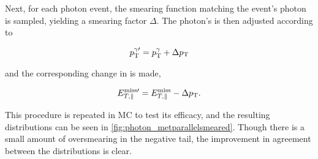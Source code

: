 Next, for each photon event, the smearing function matching the event's photon \pt is sampled, yielding a smearing factor $\Delta$\pt. The photon's \pt is then adjusted according to 

\begin{equation}
p_{\text{T}}^{\gamma\prime} = p_{\text{T}}^\gamma + \Delta p_{\text{T}} 
\end{equation} 

and the corresponding change in \met is made,

\begin{equation}
E_{T,\parallel}^{\text{miss}\prime} = E_{T,\parallel}^{\mathrm{miss}} - \Delta p_{\text{T}}.
\end{equation}

This procedure is repeated in \ac{MC} to test its efficacy, and the resulting \metl distributions can be seen in \autoref{fig:photon_metparallelsmeared}. Though there is a small amount of oversmearing in the negative tail, the improvement in agreement between the distributions is clear.

